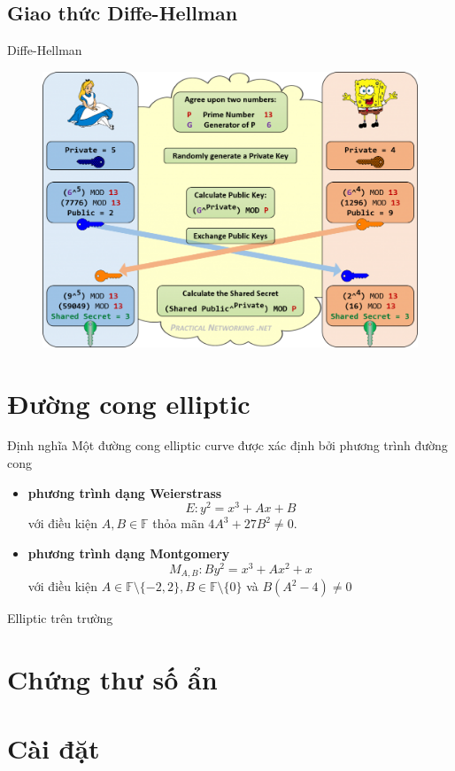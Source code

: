 \documentclass[compress]{beamer}
\begin{document}
\subsection{Giao thức Diffe-Hellman}
\begin{frame}{Diffe-Hellman}
\begin{center}
\begin{figure}
\includegraphics[width=0.9\linewidth]{../diffe-hellman.png}
\end{figure}
\end{center}
\end{frame}
\section{Đường cong elliptic}
\begin{frame}{Định nghĩa}
Một đường cong elliptic curve được xác định bởi phương trình đường cong
\begin{itemize}
\item \textbf{phương trình dạng Weierstrass}
\begin{displaymath}
E: y^2 = x^3 + Ax + B
\end{displaymath}
với điều kiện $A, B \in \mathbb{F}$ thỏa mãn $4A^3 + 27B^2 \neq 0$.
\item \textbf{phương trình dạng Montgomery}
\begin{displaymath}
M_{A,B}: By^2 = x^3 + Ax^2 + x 
\end{displaymath}
với điều kiện $A \in \mathbb{F} \setminus \{-2, 2\}, B 	\in \mathbb{F} \setminus \{0\}$ và $B(A^2 - 4) \neq 0$ 
\end{itemize}
\end{frame}
\begin{frame}{Elliptic trên trường }

\end{frame}
\section{Chứng thư số ẩn}
\section{Cài đặt}
\end{document}
